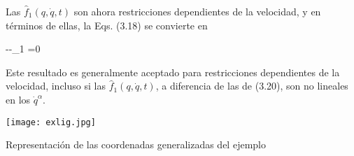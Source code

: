 Las $\hat{f}_{1}(q, \dot{q}, t)$ son ahora restricciones dependientes de la velocidad, y en términos de ellas, la Eqs. (3.18) se convierte en


\begin{DispWithArrows}[displaystyle, format=c]
 --\sum \lambda_{1} =0 
\end{DispWithArrows}


Este resultado es generalmente aceptado para restricciones dependientes de la velocidad, incluso si las $\hat{f}_{1}(q, \dot{q}, t)$, a diferencia de las de (3.20), son no lineales en los $\dot{q}^{\alpha}$.

\begin{marginfigure}[]
  \texttt{[image: exlig.jpg]}
  \caption[]{Representación de las coordenadas generalizadas del ejemplo}
\end{marginfigure}

